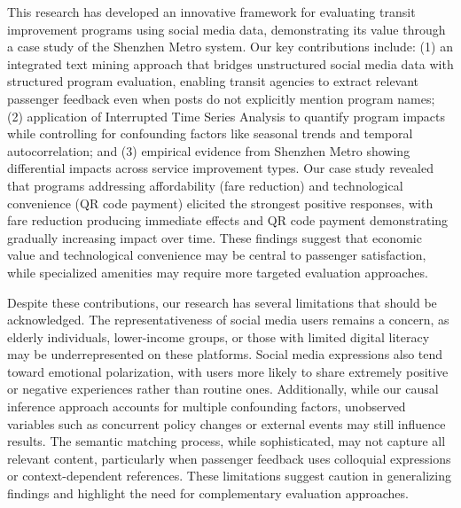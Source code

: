 \documentclass[a4paper,fleqn,12pt]{cas-sc}
\begin{document}
This research has developed an innovative framework for evaluating transit improvement programs using social media data, demonstrating its value through a case study of the Shenzhen Metro system. Our key contributions include: (1) an integrated text mining approach that bridges unstructured social media data with structured program evaluation, enabling transit agencies to extract relevant passenger feedback even when posts do not explicitly mention program names; (2) application of Interrupted Time Series Analysis to quantify program impacts while controlling for confounding factors like seasonal trends and temporal autocorrelation; and (3) empirical evidence from Shenzhen Metro showing differential impacts across service improvement types. Our case study revealed that programs addressing affordability (fare reduction) and technological convenience (QR code payment) elicited the strongest positive responses, with fare reduction producing immediate effects and QR code payment demonstrating gradually increasing impact over time. These findings suggest that economic value and technological convenience may be central to passenger satisfaction, while specialized amenities may require more targeted evaluation approaches.

Despite these contributions, our research has several limitations that should be acknowledged. The representativeness of social media users remains a concern, as elderly individuals, lower-income groups, or those with limited digital literacy may be underrepresented on these platforms. Social media expressions also tend toward emotional polarization, with users more likely to share extremely positive or negative experiences rather than routine ones. Additionally, while our causal inference approach accounts for multiple confounding factors, unobserved variables such as concurrent policy changes or external events may still influence results. The semantic matching process, while sophisticated, may not capture all relevant content, particularly when passenger feedback uses colloquial expressions or context-dependent references. These limitations suggest caution in generalizing findings and highlight the need for complementary evaluation approaches.
\end{document}
